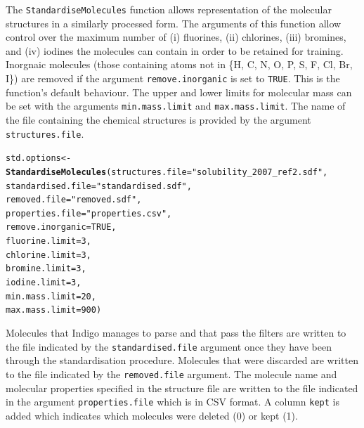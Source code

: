 \documentclass[twoside,a4wide,12pt]{article}\usepackage[]{graphicx}\usepackage[]{color}
\makeatletter
\newcommand{\hlnum}[1]{\textcolor[rgb]{0.686,0.059,0.569}{#1}}%
\newcommand{\hlstr}[1]{\textcolor[rgb]{0.192,0.494,0.8}{#1}}%
\newcommand{\hlstd}[1]{\textcolor[rgb]{0.345,0.345,0.345}{#1}}%
\newcommand{\hlkwb}[1]{\textcolor[rgb]{0.69,0.353,0.396}{#1}}%
\newcommand{\hlkwc}[1]{\textcolor[rgb]{0.333,0.667,0.333}{#1}}%
\newcommand{\hlkwd}[1]{\textcolor[rgb]{0.737,0.353,0.396}{\textbf{#1}}}%
\newenvironment{kframe}{%
 \def\at@end@of@kframe{}%
 \ifinner\ifhmode%
  \def\at@end@of@kframe{\end{minipage}}%
  \begin{minipage}{\columnwidth}%
 \fi\fi%
 \def\FrameCommand##1{\hskip\@totalleftmargin \hskip-\fboxsep
 \colorbox{shadecolor}{##1}\hskip-\fboxsep
     \hskip-\linewidth \hskip-\@totalleftmargin \hskip\columnwidth}%
 \MakeFramed {\advance\hsize-\width
   \@totalleftmargin\z@ \linewidth\hsize
   \@setminipage}}%
 {\par\unskip\endMakeFramed%
 \at@end@of@kframe}
\newenvironment{knitrout}{}{} %
\makeatother
\begin{document}
The \texttt{StandardiseMolecules} function allows representation of the molecular structures in a similarly processed form.
The arguments of this function allow control over the maximum number of (i) fluorines, (ii) chlorines,
(iii) bromines, and (iv) iodines the molecules can contain in order to be retained for training.
Inorgnaic molecules (those containing atoms not in \{H, C, N, O, P, S, F, Cl, Br, I\}) are removed if the argument \texttt{remove.inorganic} is set to \texttt{TRUE}. This is the function's default behaviour.
The upper and lower limits for molecular mass can be set with the arguments \texttt{min.mass.limit} and \texttt{max.mass.limit}.
The name of the file containing the chemical structures is provided by the argument \texttt{structures.file}.
\begin{knitrout}
\color{fgcolor}\begin{kframe}
\begin{alltt}
\hlstd{std.options} \hlkwb{<-} \hlkwd{StandardiseMolecules}\hlstd{(}\hlkwc{structures.file}\hlstd{=}\hlstr{"solubility_2007_ref2.sdf"}\hlstd{,}
                                                \hlkwc{standardised.file}\hlstd{=}\hlstr{"standardised.sdf"}\hlstd{,}
                                                \hlkwc{removed.file}\hlstd{=}\hlstr{"removed.sdf"}\hlstd{,}
                                                \hlkwc{properties.file} \hlstd{=} \hlstr{"properties.csv"}\hlstd{,}
                                                \hlkwc{remove.inorganic}\hlstd{=}\hlnum{TRUE}\hlstd{,}
                                                \hlkwc{fluorine.limit}\hlstd{=}\hlnum{3}\hlstd{,}
                                                \hlkwc{chlorine.limit}\hlstd{=}\hlnum{3}\hlstd{,}
                                                \hlkwc{bromine.limit}\hlstd{=}\hlnum{3}\hlstd{,}
                                                \hlkwc{iodine.limit}\hlstd{=}\hlnum{3}\hlstd{,}
                                                \hlkwc{min.mass.limit}\hlstd{=}\hlnum{20}\hlstd{,}
                                                \hlkwc{max.mass.limit}\hlstd{=}\hlnum{900}\hlstd{)}
\end{alltt}
\end{kframe}
\end{knitrout}
Molecules that Indigo manages to parse and that pass the filters are written to the file indicated by the \texttt{standardised.file} argument once they have been through the standardisation procedure. Molecules that were discarded are written to the file indicated by the \texttt{removed.file} argument. The molecule name and molecular properties specified in the structure file are written to the file indicated in the argument \texttt{properties.file} which is in CSV format. A column \texttt{kept} is added which indicates which molecules were deleted (0) or kept (1).
\end{document}
